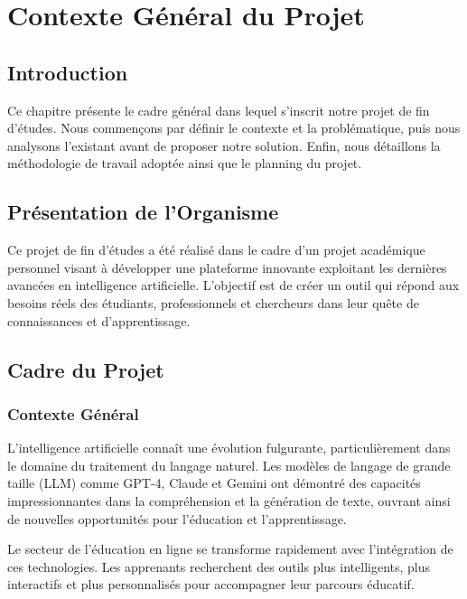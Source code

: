 
\chapter{Contexte Général du Projet}
\label{chap:contexte}

\section{Introduction}

Ce chapitre présente le cadre général dans lequel s'inscrit notre projet de fin d'études. Nous commençons par définir le contexte et la problématique, puis nous analysons l'existant avant de proposer notre solution. Enfin, nous détaillons la méthodologie de travail adoptée ainsi que le planning du projet.

\section{Présentation de l'Organisme}

Ce projet de fin d'études a été réalisé dans le cadre d'un projet académique personnel visant à développer une plateforme innovante exploitant les dernières avancées en intelligence artificielle. L'objectif est de créer un outil qui répond aux besoins réels des étudiants, professionnels et chercheurs dans leur quête de connaissances et d'apprentissage.

\section{Cadre du Projet}

\subsection{Contexte Général}

L'intelligence artificielle connaît une évolution fulgurante, particulièrement dans le domaine du traitement du langage naturel. Les modèles de langage de grande taille (LLM) comme GPT-4, Claude et Gemini ont démontré des capacités impressionnantes dans la compréhension et la génération de texte, ouvrant ainsi de nouvelles opportunités pour l'éducation et l'apprentissage.

Le secteur de l'éducation en ligne se transforme rapidement avec l'intégration de ces technologies. Les apprenants recherchent des outils plus intelligents, plus interactifs et plus personnalisés pour accompagner leur parcours éducatif.

